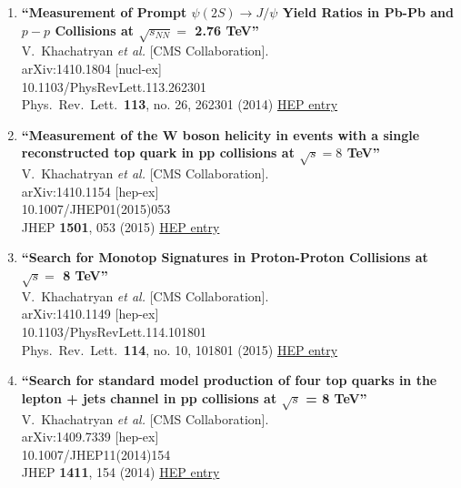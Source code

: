 \documentclass{article}
\begin{document}
\begin{enumerate}
\item%
{\bf ``Measurement of Prompt $\psi(2S) \to J/\psi$ Yield Ratios in Pb-Pb and $p-p$ Collisions at $\sqrt {s_{NN}}=$ 2.76  TeV''}
  \\{}V.~Khachatryan {\it et al.} [CMS Collaboration].
  \\{}arXiv:1410.1804 [nucl-ex]
    \\{}10.1103/PhysRevLett.113.262301
\\{}Phys.\ Rev.\ Lett.\  {\bf 113}, no. 26, 262301 (2014) %
\href{http://inspirehep.net/record/1320775}{HEP entry}


\item%
{\bf ``Measurement of the W boson helicity in events with a single reconstructed top quark in pp collisions at $ \sqrt{s}=8 $ TeV''}
  \\{}V.~Khachatryan {\it et al.} [CMS Collaboration].
  \\{}arXiv:1410.1154 [hep-ex]
    \\{}10.1007/JHEP01(2015)053
\\{}JHEP {\bf 1501}, 053 (2015) %
\href{http://inspirehep.net/record/1320561}{HEP entry}


\item%
{\bf ``Search for Monotop Signatures in Proton-Proton Collisions at $\sqrt s =$ 8 TeV''}
  \\{}V.~Khachatryan {\it et al.} [CMS Collaboration].
  \\{}arXiv:1410.1149 [hep-ex]
    \\{}10.1103/PhysRevLett.114.101801
\\{}Phys.\ Rev.\ Lett.\  {\bf 114}, no. 10, 101801 (2015) %
\href{http://inspirehep.net/record/1320560}{HEP entry}


\item%
{\bf ``Search for standard model production of four top quarks in the lepton + jets channel in pp collisions at $\sqrt{s}$ = 8 TeV''}
  \\{}V.~Khachatryan {\it et al.} [CMS Collaboration].
  \\{}arXiv:1409.7339 [hep-ex]
    \\{}10.1007/JHEP11(2014)154
\\{}JHEP {\bf 1411}, 154 (2014) %
\href{http://inspirehep.net/record/1318946}{HEP entry}



\end{enumerate}
\end{document}
